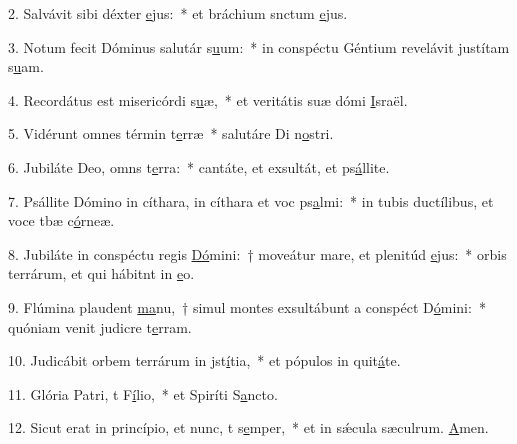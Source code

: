 2. Salvávit sibi déxter \uline{e}jus:~* et bráchium snctum \uline{e}jus.\par 
3. Notum fecit Dóminus salutár s\uline{u}um:~* in conspéctu Géntium revelávit justítam s\uline{u}am.\par 
4. Recordátus est misericórdi s\uline{u}æ,~* et veritátis suæ dómi \uline{I}sraël.\par 
5. Vidérunt omnes términ t\uline{e}rræ~* salutáre Di n\uline{o}stri.\par 
6. Jubiláte Deo, omns t\uline{e}rra:~* cantáte, et exsultát, et ps\uline{á}llite.\par 
7. Psállite Dómino in cíthara, in cíthara et voc ps\uline{a}lmi:~* in tubis ductílibus, et voce tbæ c\uline{ó}rneæ.\par 
8. Jubiláte in conspéctu regis \uline{Dó}mini:~† moveátur mare, et plenitúd \uline{e}jus:~* orbis terrárum, et qui hábitnt in \uline{e}o.\par 
9. Flúmina plaudent \uline{ma}nu,~† simul montes exsultábunt a conspéct D\uline{ó}mini:~* quóniam venit judicre t\uline{e}rram.\par 
10. Judicábit orbem terrárum in jst\uline{í}tia,~* et pópulos in quit\uline{á}te.\par 
11. Glória Patri, t F\uline{í}lio,~* et Spiríti S\uline{a}ncto.\par 
12. Sicut erat in princípio, et nunc, t s\uline{e}mper,~* et in sǽcula sæculrum. \uline{A}men.\par 
